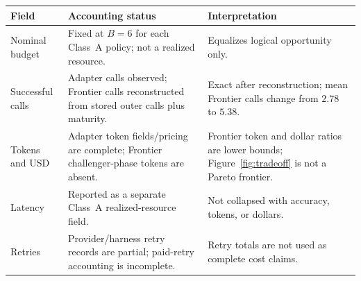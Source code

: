 \begin{tabularx}{\textwidth}{@{}>{\raggedright\arraybackslash}p{3.0cm}>{\raggedright\arraybackslash}p{5.8cm}Y@{}}
\toprule
Field & Accounting status & Interpretation \\
\midrule
Nominal budget & Fixed at $B{=}6$ for each Class~A policy; not a realized resource. & Equalizes logical opportunity only. \\
Successful calls & Adapter calls observed; Frontier calls reconstructed from stored outer calls plus maturity. & Exact after reconstruction; mean Frontier calls change from $2.78$ to $5.38$. \\
Tokens and USD & Adapter token fields/pricing are complete; Frontier challenger-phase tokens are absent. & Frontier token and dollar ratios are lower bounds; Figure~\ref{fig:tradeoff} is not a Pareto frontier. \\
Latency & Reported as a separate Class~A realized-resource field. & Not collapsed with accuracy, tokens, or dollars. \\
Retries & Provider/harness retry records are partial; paid-retry accounting is incomplete. & Retry totals are not used as complete cost claims. \\
\bottomrule
\end{tabularx}
